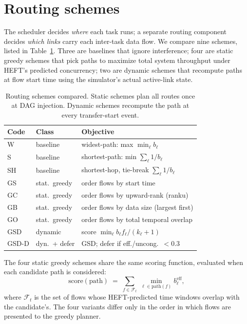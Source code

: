 \documentclass[conference]{IEEEtran}
\begin{document}
\section{Routing schemes}
\label{sec:routing}

The scheduler decides \emph{where} each task runs; a separate routing
component decides \emph{which links} carry each inter-task data flow. We
compare nine schemes, listed in Table~\ref{tab:schemes}. Three are baselines
that ignore interference; four are static greedy schemes that pick paths to
maximize total system throughput under HEFT's predicted concurrency; two are
dynamic schemes that recompute paths at flow start time using the simulator's
actual active-link state.

\begin{table}[t]
\centering
\caption{Routing schemes compared. Static schemes plan all routes once at DAG
injection. Dynamic schemes recompute the path at every transfer-start event.}
\label{tab:schemes}
\footnotesize
\setlength{\tabcolsep}{3pt}
\begin{tabular}{l l l}
\toprule
\textbf{Code} & \textbf{Class} & \textbf{Objective} \\
\midrule
W   & baseline    & widest-path: max $\min_\ell b_\ell$ \\
S   & baseline    & shortest-path: min $\sum_\ell 1/b_\ell$ \\
SH  & baseline    & shortest-hop, tie-break $\sum_\ell 1/b_\ell$ \\
\midrule
GS  & stat.\ greedy & order flows by start time \\
GC  & stat.\ greedy & order flows by upward-rank (ranku) \\
GB  & stat.\ greedy & order flows by data size (largest first) \\
GO  & stat.\ greedy & order flows by total temporal overlap \\
\midrule
GSD    & dynamic       & score $\min_\ell b_\ell f_\ell/(k_\ell+1)$ \\
GSD-D  & dyn.\ + defer & GSD; defer if eff./uncong.\ $<0.3$ \\
\bottomrule
\end{tabular}
\end{table}

The four static greedy schemes share the same scoring function, evaluated
when each candidate path is considered:
\begin{equation}
\mathrm{score}(\text{path}) \;=\; \sum_{f\in\mathcal{F}_t}\,\min_{\ell\in\text{path}(f)} b_\ell^{\text{eff}},
\label{eq:greedy}
\end{equation}
where $\mathcal{F}_t$ is the set of flows whose HEFT-predicted time windows
overlap with the candidate's. The four variants differ only in the order in
which flows are presented to the greedy planner.
\end{document}
